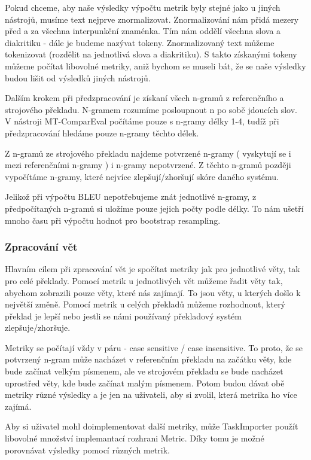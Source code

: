 Pokud chceme,
  aby naše výsledky výpočtu metrik byly stejné jako u jiných nástrojů,
  musíme text nejprve znormalizovat.
Znormalizování nám přidá mezery před a za všechna interpunkční znaménka.
Tím nám oddělí všechna slova a diakritiku - dále je budeme nazývat tokeny.
Znormalizovaný text můžeme tokenizovat (rozdělit na jednotlivá slova a diakritiku).
S takto získanými tokeny můžeme počítat libovolné metriky,
  aniž bychom se museli bát,
  že se naše výsledky budou lišit od výsledků jiných nástrojů.

Dalším krokem při předzpracování je získaní všech n-gramů z referenčního a strojového překladu.
N-gramem rozumíme posloupnout n po sobě jdoucích slov.
V nástroji MT-ComparEval počítáme pouze s n-gramy délky 1-4,
  tudíž při předzpracování hledáme pouze n-gramy těchto délek. 

Z n-gramů ze strojového překladu najdeme potvrzené n-gramy
  ( vyskytují se i mezi referenčními n-gramy )
  i n-gramy nepotvrzené.
Z těchto n-gramů později vypočítáme n-gramy,
  které nejvíce zlepšují/zhoršují skóre daného systému.
  
Jelikož při výpočtu BLEU nepotřebujeme znát jednotlivé n-gramy,
  z předpočítaných n-gramů si uložíme pouze jejich počty podle délky.
To nám ušetří mnoho času při výpočtu hodnot pro bootstrap resampling.

\subsubsection{Zpracování vět}
Hlavním cílem při zpracování vět je spočítat metriky jak pro jednotlivé věty,
  tak pro celé překlady.
Pomocí metrik u jednotlivých vět můžeme řadit věty tak,
  abychom zobrazili pouze věty, 
  které nás zajímají.
To jsou věty, u kterých došlo k největší změně.
Pomocí metrik u celých překladů můžeme rozhodnout,
  který překlad je lepší
  nebo jestli se námi používaný překladový systém zlepšuje/zhoršuje.

Metriky se počítají vždy v páru - case sensitive / case insensitive.
To proto, že se potvrzený n-gram může nacházet v referenčním překladu na začátku věty,
  kde bude začínat velkým písmenem,
  ale ve strojovém překladu se bude nacházet uprostřed věty,
  kde bude začínat malým písmenem.
Potom budou dávat obě metriky různé výsledky 
  a je jen na uživateli,
  aby si zvolil, která metrika ho více zajímá.

Aby si uživatel mohl doimplementovat další metriky,
  může TaskImporter použít libovolné množství implemantací rozhrani Metric.
Díky tomu je možné porovnávat výsledky pomocí různých metrik.

